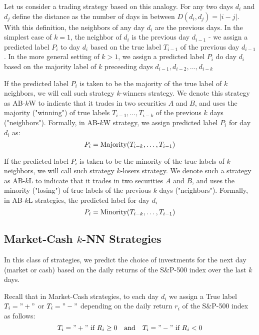 \documentclass{article}
\begin{document}
Let us consider a trading strategy based on this analogy. For any two days $d_{i}$ and $d_{j}$ define the distance as the number
of days in between $D(d_{i}, d_{j})=\vert i - j\vert$. With this definition, the neighbors of any day $d_{i}$ are the previous days.
In the simplest case of $k=1$, the neighbor of $d_{i}$ is the previous day $d_{i-1}$ - we assign a predicted label $P_{i}$
to day $d_{i}$ based on the true label $T_{i-1}$ of the previous day $d_{i-1}$. In the more general setting of $k>1$, we assign
a predicted label $P_{i}$ do day $d_{i}$ based on the majority label of $k$ preceeding days
$d_{i-1},d_{i-2},\ldots, d_{i-k}$

If the predicted label $P_{i}$ is taken to be the majority of the true label of $k$ neighbors, we will call such strategy $k$-winners strategy. We denote this strategy as AB-$k$W to indicate that it trades in two securities $A$ and $B$, 
and uses the majority ("winning") of true labels $T_{i-1},\ldots, T_{i-k}$ of the previous $k$ days ("neighbors").
Formally, in AB-$k$W strategy, we assign predicted label $P_{i}$ for day $d_{i}$ as:
\begin{equation*}
P_{i} = \hbox{Majority}(T_{i-k},\ldots,T_{i-1})
\end{equation*}


If the predicted label $P_{i}$ is taken to be the minority of the true labels of $k$ neighbors, we will call such 
strategy $k$-losers strategy. We denote such a strategy as AB-$k$L  to indicate that it 
trades in two securities $A$ and $B$, and uses the minority ("losing") of true labels of the previous $k$ days ("neighbors").
Formally, in AB-$k$L strategies, the predicted label for day $d_{i}$ 
\begin{equation*}
P_{i} = \hbox{Minority}(T_{i-k},\ldots,T_{i-1})
\end{equation*}


\subsection{Market-Cash $k$-NN Strategies}

In this class of strategies, we predict the choice of investments for the next day (market or cash) based on the daily returns of the S{\&}P-500 index over the last $k$ days. 

Recall that in Market-Cash strategies,
to each day $d_{i}$ we assign a True label $T_{i}="+"$  or $T_{i}="-"$ depending on the daily return $r_{i}$ of the S{\&}P-500
index as follows:
\begin{equation*}
T_{i}="+" \hbox{ if } R_{i}\geq 0 \quad\hbox{and}\quad
 T_{i}="-" \hbox{ if } R_{i} < 0
 \end{equation*}
\end{document}
